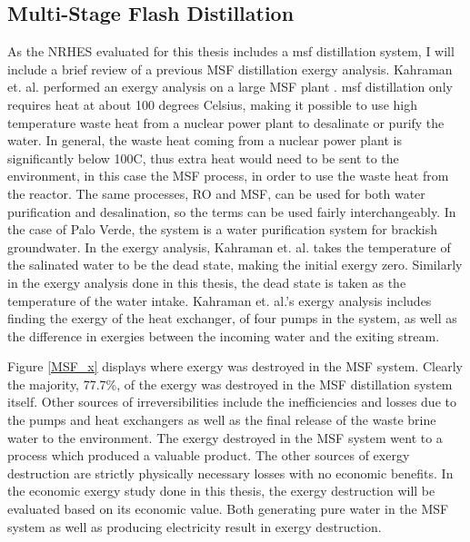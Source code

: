 \documentclass[12pt]{UIdahoMastersThesis}
\begin{document}
\subsection{Multi-Stage Flash Distillation}
As the NRHES evaluated for this thesis includes a \ac{msf} distillation system, I will include a brief review of a previous MSF distillation exergy analysis. Kahraman et. al. performed an exergy analysis on a large MSF plant \cite{Kahraman2005}.  \ac{msf} distillation only requires heat at about 100 degrees Celsius, making it possible to use high temperature waste heat from a nuclear power plant to desalinate or purify the water. In general, the waste heat coming from a nuclear power plant is significantly below 100\degree C, thus extra heat would need to be sent to the environment, in this case the MSF process, in order to use the waste heat from the reactor. The same processes, RO and MSF, can be used for both water purification and desalination, so the terms can be used fairly interchangeably. In the case of Palo Verde, the system is a water purification system for brackish groundwater. In the exergy analysis, Kahraman et. al. takes the temperature of the salinated water to be the dead state, making the initial exergy zero. Similarly in the exergy analysis done in this thesis, the dead state is taken as the temperature of the water intake. Kahraman et. al.'s exergy analysis includes finding the exergy of the heat exchanger, of four pumps in the system, as well as the difference in exergies between the incoming water and the exiting stream. 

Figure \ref{MSF_x} displays where exergy was destroyed in the MSF system. Clearly the majority, 77.7\%, of the exergy was destroyed in the MSF distillation system itself. Other sources of irreversibilities include the inefficiencies and losses due to the pumps and heat exchangers as well as the final release of the waste brine water to the environment. The exergy destroyed in the MSF system went to a process which produced a valuable product.  The other sources of exergy destruction are strictly physically necessary losses with no economic benefits. In the economic exergy study done in this thesis, the exergy destruction will be evaluated based on its economic value.  Both generating pure water in the MSF system as well as producing electricity result in exergy destruction.
\end{document}
